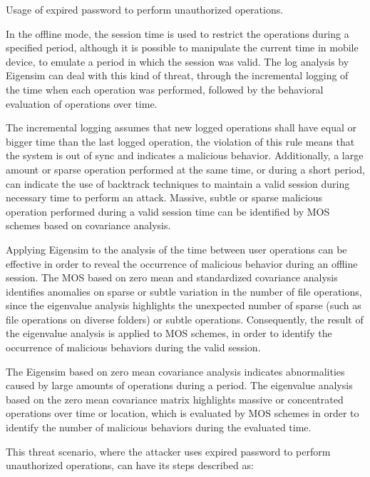 \begin{thm}
	Usage of expired password to perform unauthorized operations.
\end{thm}

In the offline mode, the session time is used to restrict the operations during a specified period, although it is possible to manipulate the current time in mobile device, to emulate a period in which the session was valid. The log analysis by Eigensim can deal with this kind of threat, through the incremental logging of the time when each operation was performed, followed by the behavioral evaluation of operations over time. 

The incremental logging assumes that new logged operations shall have equal or bigger time than the last logged operation, the violation of this rule means that the system is out of sync and indicates a malicious behavior. Additionally, a large amount or sparse operation performed at the same time, or during a short period, can indicate the use of backtrack techniques to maintain a valid session during necessary time to perform an attack. Massive, subtle or sparse malicious operation performed during a valid session time can be identified by MOS schemes based on covariance analysis.

Applying Eigensim to the analysis of the time between user operations can be effective in order to reveal the occurrence of malicious behavior during an offline session. The MOS based on zero mean and standardized covariance analysis identifies anomalies on sparse or subtle variation in the number of file operations, since the eigenvalue analysis highlights the unexpected number of sparse (such as file operations on diverse folders) or subtle operations. Consequently, the result of the eigenvalue analysis is applied to MOS schemes, in order to identify the occurrence of malicious behaviors during the valid session.

The Eigensim based on zero mean covariance analysis indicates abnormalities caused by large amounts of operations during a period. The eigenvalue analysis based on the zero mean covariance matrix highlights massive or concentrated operations over time or location, which is evaluated by MOS schemes in order to identify the number of malicious behaviors during the evaluated time.

This threat scenario, where the attacker uses expired password to perform unauthorized operations, can have its steps described as:

